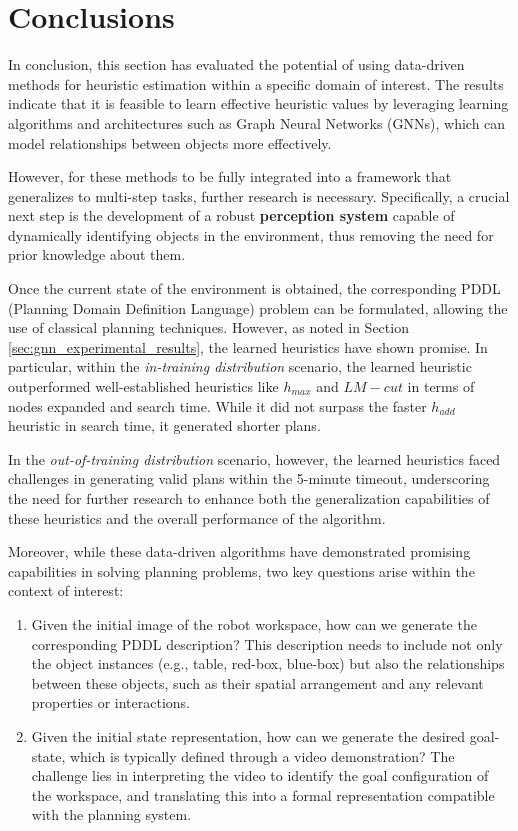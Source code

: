 \section{Conclusions}
\label{sec:gnn_conclusions}

In conclusion, this section has evaluated the potential of using data-driven methods for heuristic estimation within a specific domain of interest. The results indicate that it is feasible to learn effective heuristic values by leveraging learning algorithms and architectures such as Graph Neural Networks (GNNs), which can model relationships between objects more effectively.

However, for these methods to be fully integrated into a framework that generalizes to multi-step tasks, further research is necessary. Specifically, a crucial next step is the development of a robust \textbf{perception system} capable of dynamically identifying objects in the environment, thus removing the need for prior knowledge about them.

Once the current state of the environment is obtained, the corresponding PDDL (Planning Domain Definition Language) problem can be formulated, allowing the use of classical planning techniques. However, as noted in Section \ref{sec:gnn_experimental_results}, the learned heuristics have shown promise. In particular, within the \textit{in-training distribution} scenario, the learned heuristic \\ outperformed well-established heuristics like $h_{max}$ and $LM-cut$ in terms of nodes expanded and search time. While it did not surpass the faster $h_{add}$ heuristic in search time, it generated shorter plans.

In the \textit{out-of-training distribution} scenario, however, the learned heuristics faced challenges in generating valid plans within the 5-minute timeout, underscoring the need for further research to enhance both the generalization capabilities of these heuristics and the overall performance of the algorithm.

Moreover, while these data-driven algorithms have demonstrated promising capabilities in solving planning problems, two key questions arise within the context of interest:

\begin{enumerate}
    \item Given the initial image of the robot workspace, how can we generate the corresponding PDDL description? This description needs to include not only the object instances (e.g., table, red-box, blue-box) but also the relationships between these objects, such as their spatial arrangement and any relevant properties or interactions.
    \item Given the initial state representation, how can we generate the desired goal-state, which is typically defined through a video demonstration? The challenge lies in interpreting the video to identify the goal configuration of the workspace, and translating this into a formal representation compatible with the planning system.
\end{enumerate}

